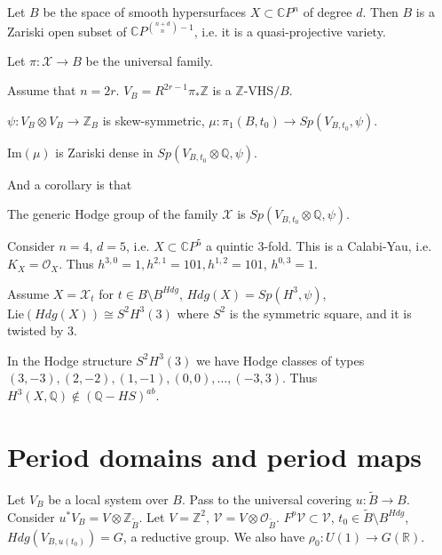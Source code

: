 \begin{example}
\label{example-hypersurface}
Let $B$ be the space of smooth hypersurfaces
$X \subset \mathbb{C}P^n$
of degree $d$.
Then $B$ is a Zariski open subset of
$\mathbb{C}P^{\binom{n+d}{n}-1}$,
i.e. it is a quasi-projective variety.

Let $\pi:\mathcal{X} \to B$ be the universal
family.

Assume that  $n=2r$.
$V_B=R^{2r-1}\pi_\ast\mathbb{Z}$
is a $\mathbb{Z}$-VHS$/B$.

$\psi:V_B \otimes V_B \to \mathbb{Z}_B$
is skew-symmetric,
$\mu:\pi_1(B,t_0) \to Sp(V_{B,t_0},\psi)$.

\begin{theorem}
\label{theorem-kazhdan-margulis}
$\text{Im}(\mu)$ is Zariski dense in
$Sp(V_{B,t_0}\otimes \mathbb{Q},\psi)$.
\end{theorem}

And a corollary is that
\begin{corollary}
\label{lemma-generic-hodge-is-sp}
The generic Hodge group of the family
$\mathcal{X}$
is $Sp(V_{B,t_0} \otimes \mathbb{Q},\psi)$.
\end{corollary}

\medskip\noindent
Consider $n=4$, $d=5$, i.e.
$X \subset \mathbb{C}P^5$ a quintic 3-fold.
This is a Calabi-Yau, i.e. $K_X =
\mathcal{O}_X$.
Thus $h^{3,0}=1,h^{2,1}=101,h^{1,2}=101$,
$h^{0,3}=1$.

Assume  $X=\mathcal{X}_t$ for $t \in B
\setminus B^{Hdg}$,
$Hdg(X)=Sp(H^3,\psi)$,
$\text{Lie}(Hdg(X))\cong S^2H^3(3)$
where $S^2$ is the symmetric square, and it
is twisted by 3.

In the Hodge structure $S^2H^3(3)$
we have Hodge classes of types
$(3,-3),(2,-2),(1,-1),(0,0),…,(-3,3)$.
Thus $H^3(X,\mathbb{Q}) \notin
(\mathbb{Q}-HS)^{ab}$.
\end{example}

\section{Period domains and period maps}
\label{section-periods}


\medskip\noindent
Let $V_B$ be a local system over $B$.
Pass to the universal covering
$u:\tilde{B}\to B$.
Consider $u^* V_B=V \otimes
\mathbb{Z}_{\tilde{B}}$.
Let $V=\mathbb{Z}^2$,
$\mathcal{V}=V \otimes
\mathcal{O}_{\tilde{B}}$.
$F^p\mathcal{V} \subset \mathcal{V}$,
$t_0 \in \tilde{B}\setminus B^{Hdg}$,
$Hdg(V_{B,u(t_0)})=G$, a reductive group.
We also have $\rho_0:U(1) \to G(\mathbb{R})$.

